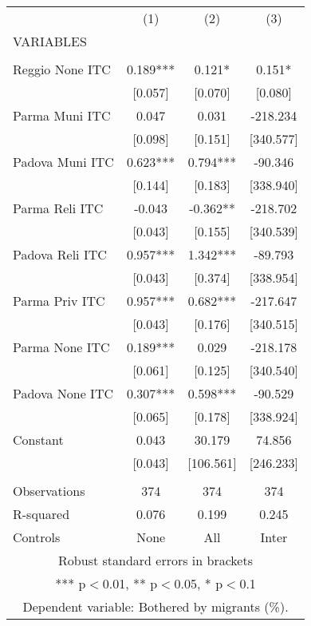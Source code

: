 \begin{tabular}{lccc} \hline
 & (1) & (2) & (3) \\
VARIABLES &  &  &  \\ \hline
 &  &  &  \\
Reggio None ITC & 0.189*** & 0.121* & 0.151* \\
 & [0.057] & [0.070] & [0.080] \\
Parma Muni ITC & 0.047 & 0.031 & -218.234 \\
 & [0.098] & [0.151] & [340.577] \\
Padova Muni ITC & 0.623*** & 0.794*** & -90.346 \\
 & [0.144] & [0.183] & [338.940] \\
Parma Reli ITC & -0.043 & -0.362** & -218.702 \\
 & [0.043] & [0.155] & [340.539] \\
Padova Reli ITC & 0.957*** & 1.342*** & -89.793 \\
 & [0.043] & [0.374] & [338.954] \\
Parma Priv ITC & 0.957*** & 0.682*** & -217.647 \\
 & [0.043] & [0.176] & [340.515] \\
Parma None ITC & 0.189*** & 0.029 & -218.178 \\
 & [0.061] & [0.125] & [340.540] \\
Padova None ITC & 0.307*** & 0.598*** & -90.529 \\
 & [0.065] & [0.178] & [338.924] \\
Constant & 0.043 & 30.179 & 74.856 \\
 & [0.043] & [106.561] & [246.233] \\
 &  &  &  \\
Observations & 374 & 374 & 374 \\
R-squared & 0.076 & 0.199 & 0.245 \\
 Controls & None & All & Inter \\ \hline
\multicolumn{4}{c}{ Robust standard errors in brackets} \\
\multicolumn{4}{c}{ *** p$<$0.01, ** p$<$0.05, * p$<$0.1} \\
\multicolumn{4}{c}{ Dependent variable: Bothered by migrants (\%).} \\
\end{tabular}
